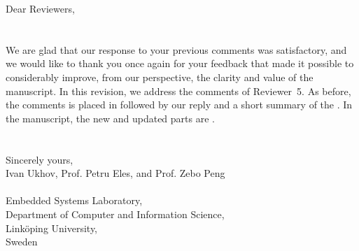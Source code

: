 Dear Reviewers,
\\
\\
\\
\noindent We are glad that our response to your previous comments was satisfactory, and we would like to thank you once again for your feedback that made it possible to considerably improve, from our perspective, the clarity and value of the manuscript.
In this revision, we address the comments of Reviewer~5.
As before, the comments is placed in  followed by our reply and a short summary of the .
In the manuscript, the new and updated parts are .
\\
\\
\\
\noindent Sincerely yours,\\
Ivan Ukhov, Prof. Petru Eles, and Prof. Zebo Peng
\\
\\
\noindent Embedded Systems Laboratory,\\
Department of Computer and Information Science,\\
Link\"{o}ping University,\\
Sweden
